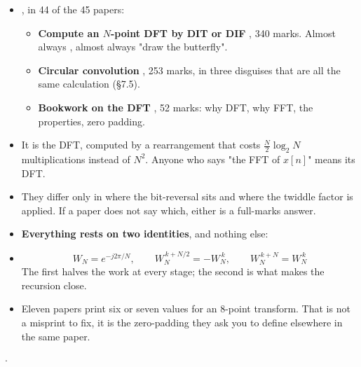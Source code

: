 \begin{itemize}
  \item {}, in 44 of the 45 papers:
  \begin{itemize}
    \item \textbf{Compute an $N$-point DFT by DIT or DIF} , 340 marks. Almost
          always , almost always "draw the butterfly".
    \item \textbf{Circular convolution} , 253 marks, in three disguises that are
          all the same calculation (\S7.5).
    \item \textbf{Bookwork on the DFT} , 52 marks: why DFT, why FFT, the
          properties, zero padding.
  \end{itemize}
  \item {} It is the DFT, computed by a rearrangement
        that costs $\tfrac{N}{2}\log_2N$ multiplications instead of $N^2$. Anyone who
        says "the FFT of $x[n]$" means its DFT.
  \item {} They differ only in where the
        bit-reversal sits and where the twiddle factor is applied. If a paper does not
        say which, either is a full-marks answer.
  \item \textbf{Everything rests on two identities}, and nothing else:
  \item[] \[ W_N=e^{-j2\pi/N},\qquad
             W_N^{\,k+N/2}=-W_N^{\,k},\qquad W_N^{\,k+N}=W_N^{\,k} \]
        The first halves the work at every stage; the second is what makes the
        recursion close.
  \item {} Eleven papers print six or
        seven values for an 8-point transform. That is not a misprint to fix, it is
        the zero-padding they ask you to define elsewhere in the same paper.
\end{itemize}

\hr


{\color{sub}\footnotesize {}  \gap$\cdot$\gap {}}

